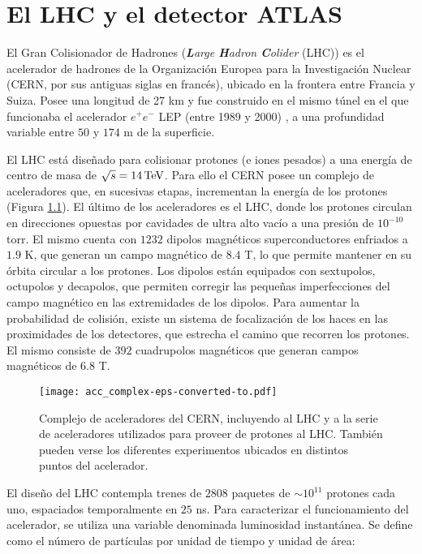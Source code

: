 \chapter{El LHC y el detector ATLAS}



El Gran Colisionador de Hadrones (\textit{\textbf{L}arge \textbf{H}adron \textbf{C}olider} (LHC)) \cite{Evans:1129806} es el acelerador de hadrones de la Organización Europea para la Investigación Nuclear (CERN, por sus antiguas siglas en francés), ubicado en la frontera entre Francia y Suiza. Posee una longitud de 27 km y fue construido en el mismo túnel en el que funcionaba el acelerador $e^{+}e^{-}$ LEP (entre 1989 y 2000) \cite{LEPbook}, a una profundidad variable entre $50$ y $174$ m de la superficie.

El LHC está diseñado para colisionar protones (e iones pesados) a una energía de centro de masa de $\sqrt{s}=14 \, \mathrm{TeV}$. Para ello el CERN posee un complejo de aceleradores que, en sucesivas etapas, incrementan la energía de los protones (Figura \ref{acc_complex}). El último de los aceleradores es el LHC, donde los protones circulan en direcciones opuestas por cavidades de ultra alto vacío a una presión de $10^{-10}$ torr. El mismo cuenta con $1232$ dipolos magnéticos superconductores enfriados a $1.9$ K, que generan un campo magnético de $8.4$ T, lo que permite mantener en su órbita circular a los protones. Los dipolos están equipados con sextupolos, octupolos y decapolos, que permiten corregir las pequeñas imperfecciones del campo magnético en las extremidades de los dipolos. Para aumentar la probabilidad de colisión, existe un sistema de focalización de los haces en las proximidades de los detectores, que estrecha el camino que recorren los protones. El mismo consiste de $392$ cuadrupolos magnéticos que generan campos magnéticos de $6.8$ T. 

\begin{figure}
\centering
\texttt{[image: acc\_complex-eps-converted-to.pdf]}
\caption{Complejo de aceleradores del CERN, incluyendo al LHC y a la serie de aceleradores utilizados para proveer de protones al LHC. También pueden verse los diferentes experimentos ubicados en distintos puntos del acelerador.}
\label{acc_complex}
\end{figure}

El diseño del LHC contempla trenes de $2808$ paquetes de $\sim 10^{11}$ protones cada uno, espaciados temporalmente en $25$ ns. Para caracterizar el funcionamiento del acelerador, se utiliza una variable denominada luminosidad instantánea. Se define como el número de partículas por unidad de tiempo y unidad de área:

